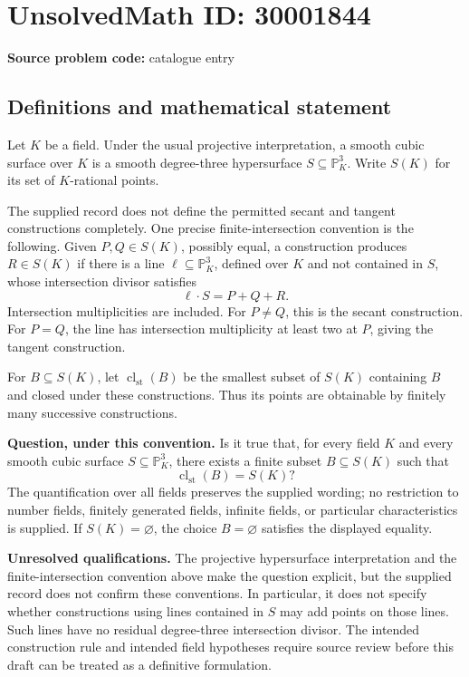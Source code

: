 \documentclass[11pt]{article}
\newcommand{\PP}{\mathbb{P}}
\begin{document}
\section*{UnsolvedMath ID: 30001844}
\textbf{Source problem code:} catalogue entry
\subsection{Definitions and mathematical statement}
Let \(K\) be a field. Under the usual projective interpretation, a smooth cubic surface over \(K\) is a smooth degree-three hypersurface \(S\subseteq\PP^3_K\). Write \(S(K)\) for its set of \(K\)-rational points.

The supplied record does not define the permitted secant and tangent constructions completely. One precise finite-intersection convention is the following. Given \(P,Q\in S(K)\), possibly equal, a construction produces \(R\in S(K)\) if there is a line \(\ell\subseteq\PP^3_K\), defined over \(K\) and not contained in \(S\), whose intersection divisor satisfies
\[
\ell\cdot S=P+Q+R.
\]
Intersection multiplicities are included. For \(P\ne Q\), this is the secant construction. For \(P=Q\), the line has intersection multiplicity at least two at \(P\), giving the tangent construction.

For \(B\subseteq S(K)\), let \(\operatorname{cl}_{\mathrm{st}}(B)\) be the smallest subset of \(S(K)\) containing \(B\) and closed under these constructions. Thus its points are obtainable by finitely many successive constructions.

\textbf{Question, under this convention.} Is it true that, for every field \(K\) and every smooth cubic surface \(S\subseteq\PP^3_K\), there exists a finite subset \(B\subseteq S(K)\) such that
\[
\operatorname{cl}_{\mathrm{st}}(B)=S(K)?
\]
The quantification over all fields preserves the supplied wording; no restriction to number fields, finitely generated fields, infinite fields, or particular characteristics is supplied. If \(S(K)=\varnothing\), the choice \(B=\varnothing\) satisfies the displayed equality.

\textbf{Unresolved qualifications.} The projective hypersurface interpretation and the finite-intersection convention above make the question explicit, but the supplied record does not confirm these conventions. In particular, it does not specify whether constructions using lines contained in \(S\) may add points on those lines. Such lines have no residual degree-three intersection divisor. The intended construction rule and intended field hypotheses require source review before this draft can be treated as a definitive formulation.
\end{document}

